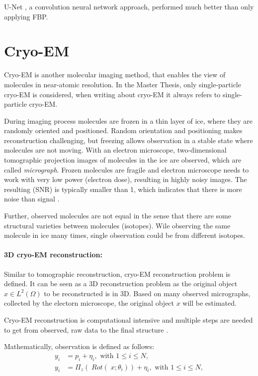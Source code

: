U-Net \citet{unet-tomography}, a convolution neural network approach, performed
much better than only applying FBP.

\section{Cryo-EM}
Cryo-EM is another molecular imaging method, that enables the view of molecules in near-atomic resolution.
In the Master Thesis, only single-particle cryo-EM \cite{singleParticleCryoEm} is considered, 
when writing about cryo-EM it always refers to single-particle cryo-EM.

During imaging process molecules are frozen in a thin layer of ice, where they are randomly oriented and positioned. 
Random orientation and positioning makes reconstruction challenging, 
but freezing allows observation in a stable state where molecules are not moving.
With an electron microscope, two-dimensional tomographic projection images of molecules in the ice are observed,
which are called \textit{micrograph}. 
Frozen molecules are fragile and electron microscope needs to work with
very low power (electron dose), resulting in highly noisy images. The resulting (SNR)
is typically smaller than 1, which indicates that there is more noise than signal \cite{cryoEmMath2}.

Further, observed molecules are not equal in the sense that there are some structural varieties between
molecules (isotopes). Wile observing the same molecule in ice many times, single observation could be from different isotopes.

\paragraph{3D cryo-EM reconstruction:}
Similar to tomographic reconstruction, cryo-EM reconstruction problem \cite{cryoEmMath} is defined.
It can be seen as a 3D reconstruction problem as the original object $x \in L^2(\Omega)$ to be reconstructed is in 3D.
Based on many observed micrographs, collected by the electorn microscope, the original object $x$ will be estimated.

Cryo-EM reconstruction is computational intensive and multiple steps are needed to get from observed, raw data to the final structure \cite{singleParticleCryoEm}.

Mathematically, observation is defined as follows:
\begin{equation}
    \label{eq:cryoEmSimple}
    \begin{aligned}
        y_i &= p_i + \eta_i, \text{ with } 1 \leq i \leq N,\\
        y_i &= \Pi_z  (\; Rot (\;x; \theta_i )) + \eta_i, \text{ with } 1 \leq i \leq N,    
    \end{aligned}
\end{equation}

